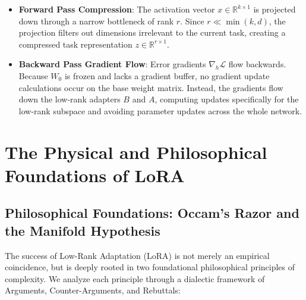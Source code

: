 \documentclass{article}
\begin{document}
\begin{itemize}
  \item \textbf{Forward Pass Compression}: The activation vector $x \in \mathbb{R}^{k \times 1}$ is projected down through a narrow bottleneck of rank $r$. Since $r \ll \min(k, d)$, the projection filters out dimensions irrelevant to the current task, creating a compressed task representation $z \in \mathbb{R}^{r \times 1}$.
  \item \textbf{Backward Pass Gradient Flow}: Error gradients $\nabla_h \mathcal{L}$ flow backwards. Because $W_0$ is frozen and lacks a gradient buffer, no gradient update calculations occur on the base weight matrix. Instead, the gradients flow down the low-rank adapters $B$ and $A$, computing updates specifically for the low-rank subspace and avoiding parameter updates across the whole network.
\end{itemize}

\section{The Physical and Philosophical Foundations of LoRA}

\subsection{Philosophical Foundations: Occam's Razor and the Manifold Hypothesis}
The success of Low-Rank Adaptation (LoRA) is not merely an empirical coincidence, but is deeply rooted in two foundational philosophical principles of complexity. We analyze each principle through a dialectic framework of Arguments, Counter-Arguments, and Rebuttals:
\end{document}
